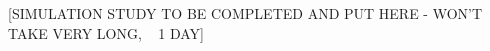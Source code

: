 \documentclass[12pt]{article}
\begin{document}
[SIMULATION STUDY TO BE COMPLETED AND PUT HERE - WON'T TAKE VERY LONG, ~ 1 DAY]


\end{document}
